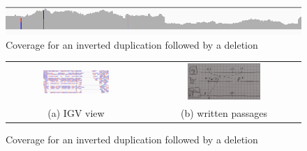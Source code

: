    \begin{figure}[H]
       \centering
       \includegraphics[width=1\textwidth]{cov3.PNG}
       \caption{Coverage for an inverted duplication followed by a deletion}
       \label{fig:cov3}
    \end{figure}


    \begin{figure}[H]
        \begin{tabular}{cc}
        \includegraphics[width=0.5\textwidth]{pos3.PNG} &   \includegraphics[width=0.5\textwidth]{pos3passages.jpg} \\
        (a) IGV view & (b) written passages \\[6pt]
        \end{tabular}
        \caption{Coverage for an inverted duplication followed by a deletion}
        \label{fig:ex_3}
    \end{figure}
